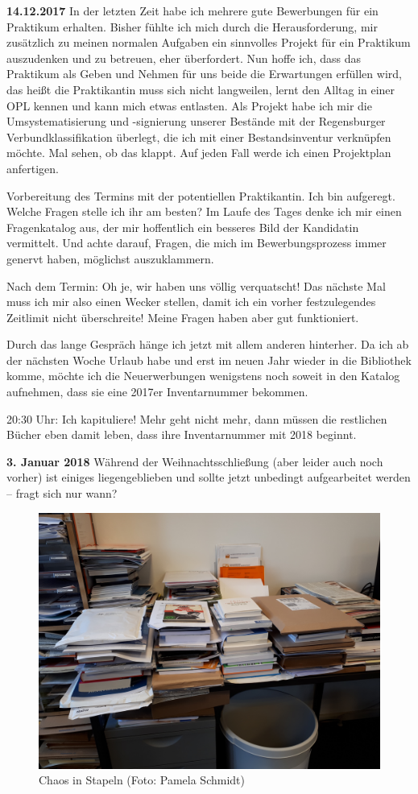 \documentclass[a4paper,
fontsize=11pt,
oneside,
numbers=noperiodatend,
parskip=half-,
bibliography=totoc,
final
]{scrartcl}
\begin{document}
\textbf{14.12.2017} In der letzten Zeit habe ich mehrere gute
Bewerbungen für ein Praktikum erhalten. Bisher fühlte ich mich durch die
Herausforderung, mir zusätzlich zu meinen normalen Aufgaben ein
sinnvolles Projekt für ein Praktikum auszudenken und zu betreuen, eher
überfordert. Nun hoffe ich, dass das Praktikum als Geben und Nehmen für
uns beide die Erwartungen erfüllen wird, das heißt die Praktikantin muss
sich nicht langweilen, lernt den Alltag in einer OPL kennen und kann
mich etwas entlasten. Als Projekt habe ich mir die Umsystematisierung
und -signierung unserer Bestände mit der Regensburger
Verbundklassifikation überlegt, die ich mit einer Bestandsinventur
verknüpfen möchte. Mal sehen, ob das klappt. Auf jeden Fall werde ich
einen Projektplan anfertigen.

Vorbereitung des Termins mit der potentiellen Praktikantin. Ich bin
aufgeregt. Welche Fragen stelle ich ihr am besten? Im Laufe des Tages
denke ich mir einen Fragenkatalog aus, der mir hoffentlich ein besseres
Bild der Kandidatin vermittelt. Und achte darauf, Fragen, die mich im
Bewerbungsprozess immer genervt haben, möglichst auszuklammern.

Nach dem Termin: Oh je, wir haben uns völlig verquatscht! Das nächste
Mal muss ich mir also einen Wecker stellen, damit ich ein vorher
festzulegendes Zeitlimit nicht überschreite! Meine Fragen haben aber gut
funktioniert.

Durch das lange Gespräch hänge ich jetzt mit allem anderen hinterher. Da
ich ab der nächsten Woche Urlaub habe und erst im neuen Jahr wieder in
die Bibliothek komme, möchte ich die Neuerwerbungen wenigstens noch
soweit in den Katalog aufnehmen, dass sie eine 2017er Inventarnummer
bekommen.

20:30 Uhr: Ich kapituliere! Mehr geht nicht mehr, dann müssen die
restlichen Bücher eben damit leben, dass ihre Inventarnummer mit 2018
beginnt.

\textbf{3. Januar 2018} Während der Weihnachtsschließung (aber leider
auch noch vorher) ist einiges liegengeblieben und sollte jetzt unbedingt
aufgearbeitet werden -- fragt sich nur wann?

\begin{figure}
\centering
\includegraphics{img/Schmidt_4.jpg}
\caption{Chaos in Stapeln (Foto: Pamela Schmidt)}
\end{figure}
\end{document}
